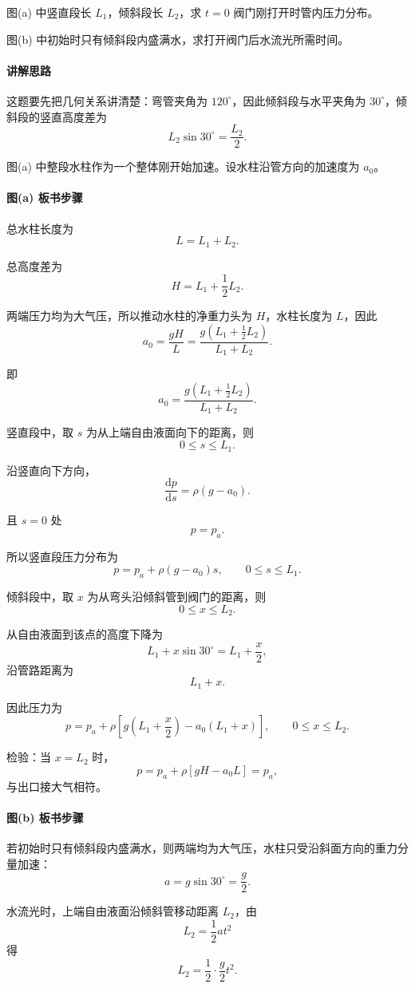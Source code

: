 \documentclass[12pt,a4paper]{ctexart}
\newcommand{\dd}{\mathrm d}
\newcommand{\pa}{p_a}
\begin{document}
图(a) 中竖直段长 $L_1$，倾斜段长 $L_2$，求 $t=0$ 阀门刚打开时管内压力分布。

图(b) 中初始时只有倾斜段内盛满水，求打开阀门后水流光所需时间。

\paragraph{讲解思路}
这题要先把几何关系讲清楚：弯管夹角为 $120^\circ$，因此倾斜段与水平夹角为 $30^\circ$，倾斜段的竖直高度差为
\[
L_2\sin30^\circ=\frac{L_2}{2}.
\]

图(a) 中整段水柱作为一个整体刚开始加速。设水柱沿管方向的加速度为 $a_0$。

\paragraph{图(a) 板书步骤}
总水柱长度为
\[
L=L_1+L_2.
\]

总高度差为
\[
H=L_1+\frac12L_2.
\]

两端压力均为大气压，所以推动水柱的净重力头为 $H$，水柱长度为 $L$，因此
\[
a_0=\frac{gH}{L}
=\frac{g\left(L_1+\frac12L_2\right)}{L_1+L_2}.
\]

即
\[
\boxed{
a_0=\frac{g\left(L_1+\frac12L_2\right)}{L_1+L_2}.
}
\]

竖直段中，取 $s$ 为从上端自由液面向下的距离，则
\[
0\le s\le L_1.
\]

沿竖直向下方向，
\[
\frac{\dd p}{\dd s}=\rho(g-a_0).
\]

且 $s=0$ 处
\[
p=\pa.
\]

所以竖直段压力分布为
\[
\boxed{
p=\pa+\rho(g-a_0)s,\qquad 0\le s\le L_1.
}
\]

倾斜段中，取 $x$ 为从弯头沿倾斜管到阀门的距离，则
\[
0\le x\le L_2.
\]

从自由液面到该点的高度下降为
\[
L_1+x\sin30^\circ=L_1+\frac{x}{2},
\]
沿管路距离为
\[
L_1+x.
\]

因此压力为
\[
\boxed{
p=\pa+\rho\left[
g\left(L_1+\frac{x}{2}\right)
-a_0(L_1+x)
\right],
\qquad 0\le x\le L_2.
}
\]

检验：当 $x=L_2$ 时，
\[
p=\pa+\rho[gH-a_0L]=\pa,
\]
与出口接大气相符。

\paragraph{图(b) 板书步骤}
若初始时只有倾斜段内盛满水，则两端均为大气压，水柱只受沿斜面方向的重力分量加速：
\[
a=g\sin30^\circ=\frac g2.
\]

水流光时，上端自由液面沿倾斜管移动距离 $L_2$，由
\[
L_2=\frac12at^2
\]
得
\[
L_2=\frac12\cdot \frac g2 t^2.
\]
\end{document}
